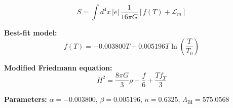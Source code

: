 
\begin{equation}
  S = \int d^4x \, |e| \, \frac{1}{16\pi G} \left[ f(T) + \mathcal{L}_m \right]
\end{equation}

\textbf{Best-fit model:}
\begin{equation}
  f(T) = -0.003800 T + 0.005196 T \ln\!\left(\frac{T}{T_0}\right)
\end{equation}

\textbf{Modified Friedmann equation:}
\begin{equation}
  H^2 = \frac{8\pi G}{3} \rho - \frac{f}{6} + \frac{T f_T}{3}
\end{equation}

\textbf{Parameters:}
$\alpha = -0.003800$, \quad
$\beta = 0.005196$, \quad
$n = 0.6325$, \quad
$\Lambda_{\text{BI}} = 575.0568$